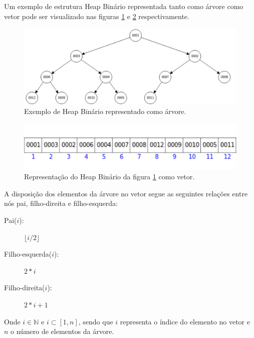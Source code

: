 Um exemplo de estrutura Heap Binário representada tanto como árvore como vetor pode ser visualizado nas figuras \ref{fig-dijkstra-heapbinario} e \ref{fig-dijkstra-heapvetor} respectivamente.

\begin{figure}[H]
\centering
\includegraphics[width=.95\textwidth]{figuras/Heap} 
\caption{Exemplo de Heap Binário representado como árvore.}
\label{fig-dijkstra-heapbinario}
\end{figure}

\begin{figure}[H]
\centering
\includegraphics[width=.60\textwidth]{figuras/Heap-vetor}
\caption{Representação do Heap Binário da figura \ref{fig-dijkstra-heapbinario} como vetor.}
\label{fig-dijkstra-heapvetor}
\end{figure}

A disposição dos elementos da árvore no vetor segue as seguintes relações entre nós pai, filho-direita e filho-esquerda:
\begin{description}
\item[Pai($i$):] $\lfloor i/2 \rfloor$
\item[Filho-esquerda($i$):] $2*i$
\item[Filho-direita($i$):] $2*i+1$
\end{description}
Onde $i \in \mathbb{N}$ e $i \subset [1, n]$, sendo que $i$ representa o índice do elemento no vetor e $n$ o número de elementos da árvore.

